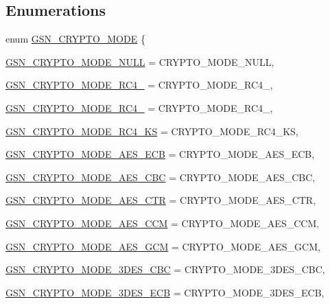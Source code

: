 \subsection*{Enumerations}
\begin{DoxyCompactItemize}
\item 
enum \hyperlink{a00515_a3010ebd2596d115219b29d0a14c1f3f6}{GSN\_\-CRYPTO\_\-MODE} \{ \par
\hyperlink{a00515_a3010ebd2596d115219b29d0a14c1f3f6a89c77f46105bcddc1146af4425937a86}{GSN\_\-CRYPTO\_\-MODE\_\-NULL} =  CRYPTO\_\-MODE\_\-NULL, 
\par
\hyperlink{a00515_a3010ebd2596d115219b29d0a14c1f3f6a761a8be09455508a138890bee8175061}{GSN\_\-CRYPTO\_\-MODE\_\-RC4\_} =  CRYPTO\_\-MODE\_\-RC4\_, 
\par
\hyperlink{a00515_a3010ebd2596d115219b29d0a14c1f3f6ac5a15f253983545af169abdf59e34c22}{GSN\_\-CRYPTO\_\-MODE\_\-RC4\_} =  CRYPTO\_\-MODE\_\-RC4\_, 
\par
\hyperlink{a00515_a3010ebd2596d115219b29d0a14c1f3f6ac8b646b119cc253f058d0965525b4023}{GSN\_\-CRYPTO\_\-MODE\_\-RC4\_\-KS} =  CRYPTO\_\-MODE\_\-RC4\_\-KS, 
\par
\hyperlink{a00515_a3010ebd2596d115219b29d0a14c1f3f6a9b8309f309b6eed10211bf3d5e0d7c09}{GSN\_\-CRYPTO\_\-MODE\_\-AES\_\-ECB} =  CRYPTO\_\-MODE\_\-AES\_\-ECB, 
\par
\hyperlink{a00515_a3010ebd2596d115219b29d0a14c1f3f6aa5fb38dfa23f8d88b69432ffbc3e3aae}{GSN\_\-CRYPTO\_\-MODE\_\-AES\_\-CBC} =  CRYPTO\_\-MODE\_\-AES\_\-CBC, 
\par
\hyperlink{a00515_a3010ebd2596d115219b29d0a14c1f3f6a7a2b02552f0d209dea3a0755dbb67996}{GSN\_\-CRYPTO\_\-MODE\_\-AES\_\-CTR} =  CRYPTO\_\-MODE\_\-AES\_\-CTR, 
\par
\hyperlink{a00515_a3010ebd2596d115219b29d0a14c1f3f6a40d31f05684483147babce0620baa63c}{GSN\_\-CRYPTO\_\-MODE\_\-AES\_\-CCM} =  CRYPTO\_\-MODE\_\-AES\_\-CCM, 
\par
\hyperlink{a00515_a3010ebd2596d115219b29d0a14c1f3f6a68bb9327cd3f01d06e2e524ab9f59b2d}{GSN\_\-CRYPTO\_\-MODE\_\-AES\_\-GCM} =  CRYPTO\_\-MODE\_\-AES\_\-GCM, 
\par
\hyperlink{a00515_a3010ebd2596d115219b29d0a14c1f3f6acc5b0be980efdaac27f2eaae46aa760d}{GSN\_\-CRYPTO\_\-MODE\_\-3DES\_\-CBC} =  CRYPTO\_\-MODE\_\-3DES\_\-CBC, 
\par
\hyperlink{a00515_a3010ebd2596d115219b29d0a14c1f3f6ab81972739240be2d2d402fa0e41eba56}{GSN\_\-CRYPTO\_\-MODE\_\-3DES\_\-ECB} =  CRYPTO\_\-MODE\_\-3DES\_\-ECB, 
\par

\end{DoxyCompactItemize}
